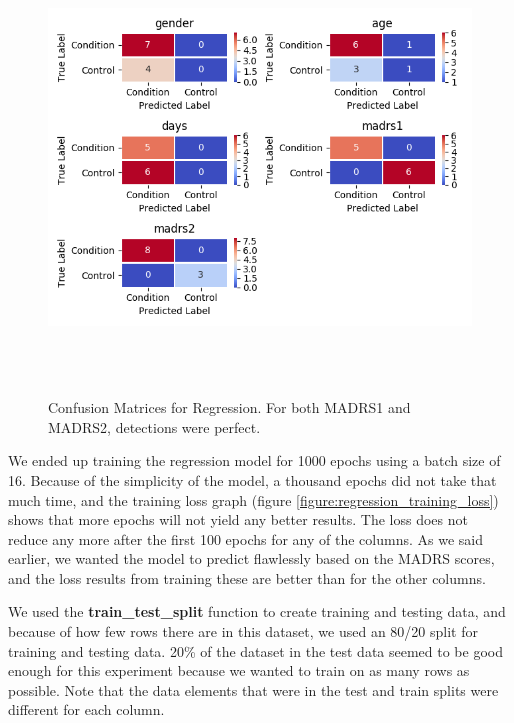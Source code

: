 \begin{figure}
\begin{center}
      \includegraphics[height=12cm]{img/regression/confusion_kerasregressor_grouped.png}
      \caption{Confusion Matrices for Regression. For both MADRS1 and MADRS2, detections were perfect.}
      \label{figure:regression_test_confusion}
\end{center}
\end{figure}

We ended up training the regression model for 1000 epochs using a batch size of 16. Because of the simplicity of the model, a thousand epochs did not take that much time, and the training loss graph (figure \ref{figure:regression_training_loss}) shows that more epochs will not yield any better results. The loss does not reduce any more after the first 100 epochs for any of the columns. As we said earlier, we wanted the model to predict flawlessly based on the MADRS scores, and the loss results from training these are better than for the other columns. 

We used the \textbf{train\_test\_split} function to create training and testing data, and because of how few rows there are in this dataset, 
we used an 80/20 split for training and testing data. 20\% of the dataset in the test data seemed to be good enough for this experiment because we wanted to train on as many rows as possible. Note that the data elements that were in the test and train splits were different for each column. 

